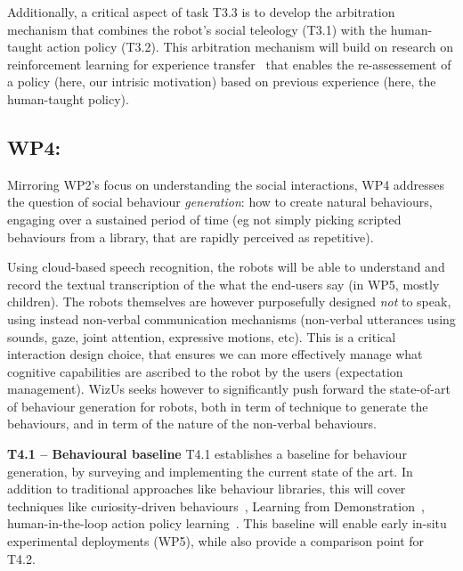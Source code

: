 \documentclass[11pt,a4paper]{report}
\newcommand{\project}{WizUs\xspace}
\begin{document}
Additionally, a critical aspect of task T3.3 is to develop the arbitration
mechanism that combines the robot's social teleology (T3.1) with the human-taught
action policy (T3.2). This arbitration mechanism will build on research on
reinforcement learning for experience transfer~\cite{madden2004transfer} that
enables the re-assessement of a policy (here, our intrisic motivation) based on
previous experience (here, the human-taught policy).



\subsection{WP4: \textbf{\wpFour}} 

\noindent{}

Mirroring WP2's focus on understanding the social interactions, WP4 addresses the
question of social behaviour \emph{generation}: how to create natural
behaviours, engaging over a sustained period of time (eg not simply picking
scripted behaviours from a library, that are rapidly perceived as repetitive).

Using cloud-based speech recognition, the robots will be able to understand and
record the textual transcription of the what the end-users say (in WP5, mostly
children). The robots themselves are however purposefully designed \emph{not} to
speak, using instead non-verbal communication mechanisms (non-verbal utterances
using sounds, gaze, joint attention, expressive motions, etc). This is a
critical interaction design choice, that ensures we can more effectively manage
what cognitive capabilities are ascribed to the robot by the users (expectation
management).  \project seeks however to significantly push forward the
state-of-art of behaviour generation for robots, both in term of technique to
generate the behaviours, and in term of the nature of the non-verbal behaviours.

\textbf{T4.1 -- Behavioural baseline} T4.1 establishes a baseline for behaviour
generation, by surveying and implementing the current state of the art. In
addition to traditional approaches like behaviour libraries, this will cover
techniques like curiosity-driven behaviours~\cite{oudeyer2005playground},
Learning from Demonstration~\cite{billard2008robot, argall2009survey},
human-in-the-loop action policy learning~\cite{senft2016sparc,
senft2019teaching}. This baseline will enable early in-situ experimental
deployments (WP5), while also provide a comparison point for T4.2.
\end{document}
